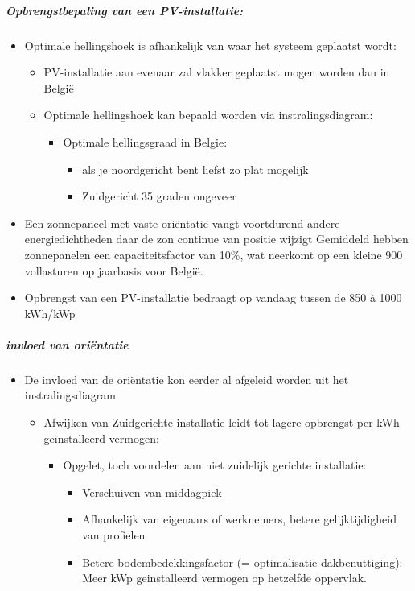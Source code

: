 \documentclass[12pt]{article}
\begin{document}
\subparagraph{Opbrengstbepaling van een PV-installatie:}
\begin{itemize}
    \item Optimale hellingshoek is afhankelijk van waar het systeem geplaatst wordt:\begin{itemize}
        \item PV-installatie aan evenaar zal vlakker geplaatst mogen worden dan in België
        \item Optimale hellingshoek kan bepaald worden via instralingsdiagram:\begin{itemize}
            \item Optimale hellingsgraad in Belgie:\begin{itemize}
                \item als je noordgericht bent liefst zo plat mogelijk 
                \item Zuidgericht 35 graden ongeveer
            \end{itemize}
        \end{itemize}
    \end{itemize}
\end{itemize}
\begin{itemize}
    \item Een zonnepaneel met vaste oriëntatie vangt voortdurend andere
    energiedichtheden daar de zon continue van positie wijzigt
    Gemiddeld hebben zonnepanelen een capaciteitsfactor van 10\%, wat neerkomt op een kleine 900 vollasturen op jaarbasis voor België.
    \item Opbrengst van een PV-installatie bedraagt op vandaag tussen de
    850 à 1000 kWh/kWp
\end{itemize}
\subparagraph{invloed van oriëntatie}
\begin{itemize}
    \item De invloed van de oriëntatie kon eerder al afgeleid worden uit het instralingsdiagram\begin{itemize}
        \item Afwijken van Zuidgerichte installatie leidt tot lagere opbrengst per kWh geïnstalleerd vermogen:\begin{itemize}
            \item Opgelet, toch voordelen aan niet zuidelijk gerichte installatie:\begin{itemize}
                \item Verschuiven van middagpiek
                \item Afhankelijk van eigenaars of werknemers, betere gelijktijdigheid van profielen
                \item Betere bodembedekkingsfactor (= optimalisatie dakbenuttiging): Meer kWp geinstalleerd vermogen op hetzelfde oppervlak.
            \end{itemize}
        \end{itemize}
    \end{itemize}
\end{itemize}
\end{document}
